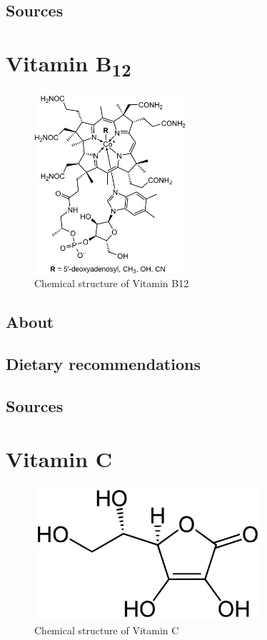 \documentclass{book}
\begin{document}
\section{Sources}


\chapter{Vitamin B\textsubscript{12}}
\begin{figure}[h]
	\caption{Chemical structure of Vitamin B12}
	\centering \includegraphics[width=0.5\textwidth]{images/Vitamin_B12_chemical_structure}
\end{figure}
\newpage

\section{About}


\section{Dietary recommendations}


\section{Sources}


\chapter{Vitamin C}
\begin{figure}[h]
	\caption{Chemical structure of Vitamin C}
	\centering \includegraphics[width=0.75\textwidth]{images/Vitamin_C_chemical_structure}
\end{figure}
\newpage
\end{document}
